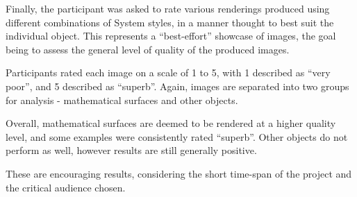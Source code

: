 Finally, the participant was asked to rate various renderings produced using different combinations of System styles, in a manner thought to best suit the individual object. This represents a ``best-effort'' showcase of images, the goal being to assess the general level of quality of the produced images.

Participants rated each image on a scale of 1 to 5, with 1 described as ``very poor'', and 5 described as ``superb''. 
Again, images are separated into two groups for analysis - mathematical surfaces and other objects.

Overall, mathematical surfaces are deemed to be rendered at a higher quality level, and some examples were consistently rated ``superb''.
Other objects do not perform as well, however results are still generally positive.

These are encouraging results, considering the short time-span of the project and the critical audience chosen.

	
